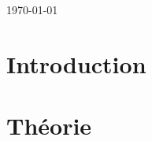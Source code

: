 \documentclass[letterpaper,12pt,oneside]{article}
\begin{document}
\begin{titlepage}


{\large \today}\\[3cm] %


 


\end{titlepage}

\newpage
\mbox{}
\thispagestyle{empty}
\newpage

\tableofcontents
\listoffigures
\listoftables

\newpage
\mbox{}
\thispagestyle{empty}
\newpage

\setcounter{page}{1}


\setlength{\parindent}{15pt} %

\begin{abstract}

\end{abstract}

\section{Introduction}


\section{Théorie}
\end{document}
